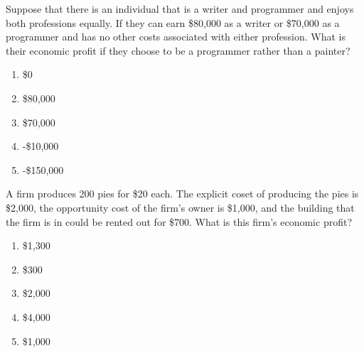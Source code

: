 \documentclass[12pt]{article}
\begin{document}
\begin{flushleft}
\vspace{1.9cm}
Suppose that there is an individual that is a writer and programmer and enjoys both professions equally. If they can earn \$80,000 as a writer or \$70,000 as a programmer and has no other costs associated with either profession. What is their economic profit if they choose to be a programmer rather than a painter?
\end{flushleft}

\begin{enumerate}[label = (\alph*)]
	\item \$0
	\item \$80,000
	\item \$70,000
	\item -\$10,000
	\item -\$150,000
\end{enumerate}

\begin{flushleft}
A firm produces 200 pies for \$20 each. The explicit coset of producing the pies is \$2,000, the opportunity cost of the firm's owner is \$1,000, and the building that the firm is in could be rented out for \$700. What is this firm's economic profit?
\end{flushleft}

\begin{enumerate}[label = (\alph*)]
	\item \$1,300
	\item \$300
	\item \$2,000
	\item \$4,000
	\item \$1,000
\end{enumerate}
\end{document}
